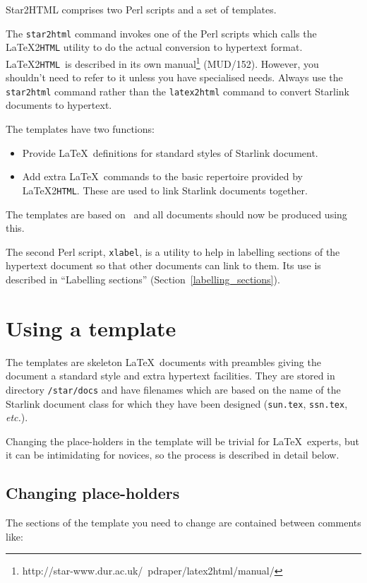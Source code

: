 \documentclass[twoside,11pt]{article}
\newcommand{\htmladdnormallinkfoot}[2]{#1\footnote{#2}}
\newcommand{\htmladdnormallink}[2]{#1}
\newcommand{\htmlref}[2]{#1}
\newcommand{\latex}[1]{#1}
\newcommand{\xlabel}[1]{}
\newcommand{\latextohtml}{\LaTeX2\texttt{HTML}}
\renewcommand{\_}{\texttt{\symbol{95}}}
\newcommand{\LtoHURL}{http://www.tex.ac.uk/tex-archive/support/latex2html/}
\newcommand{\LtoHManURL}{http://star-www.dur.ac.uk/~{}pdraper/latex2html/manual/}
\begin{document}
Star2HTML comprises two Perl scripts and a set of templates.

The
\htmlref{\texttt{star2html}}{star2html}
command invokes one of the Perl scripts which calls the
\htmladdnormallink{\latextohtml}{\LtoHURL}
utility to do the actual conversion to hypertext format.
\latextohtml\ is described in its own
\htmladdnormallinkfoot{manual}{\LtoHManURL}\latex{ (MUD/152)}.
However, you shouldn't need to refer to it unless you have specialised needs.
Always use the \texttt{star2html} command rather than the
\texttt{latex2html} command to convert Starlink documents to hypertext.

The templates have two functions:
\begin{itemize}
\item Provide \LaTeX\ definitions for standard styles of Starlink document.
\item Add extra \LaTeX\ commands to the basic repertoire provided by
\latextohtml.
These are used to link Starlink documents together.
\end{itemize}

The templates are based on \LaTeXe\, and all documents should now be
produced using this.

The second Perl script,
\htmlref{\texttt{xlabel}}{xlabel},
is a utility to help in labelling sections of the hypertext document so that
other documents can link to them.
Its use is described in
\htmlref{``Labelling sections''}{labelling_sections}
\latex{ (Section~\ref{labelling_sections})}.

\section{\xlabel{using_a_template}\label{using_a_template}Using a template}

The templates are skeleton \LaTeX\ documents with preambles giving
the document a standard style and extra hypertext facilities.
They are stored in directory \texttt{/star/docs} and have filenames
which are based on the name of the Starlink document class for which they
have been designed (\texttt{sun.tex}, \texttt{ssn.tex}, \textit{etc.}).

Changing the place-holders in the template will be trivial for \LaTeX\
experts, but it can be intimidating for novices, so the process is
described in detail below.

\subsection{\xlabel{changing_placeholders}Changing place-holders}
The sections of the template you need to change are contained between comments
like:
\end{document}
